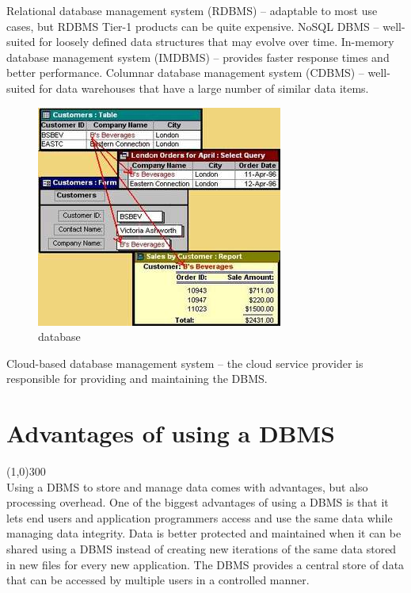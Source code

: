 \documentclass{article}
\begin{document}
Relational database management system (RDBMS) -- adaptable to most use cases, but RDBMS Tier-1 products can be quite expensive.
NoSQL DBMS -- well-suited for loosely defined data structures that may evolve over time.
In-memory database management system (IMDBMS) -- provides faster response times and better performance.
Columnar database management system (CDBMS) -- well-suited for data warehouses that have a large number of similar data items.
\begin{figure}[h]
\centering
\includegraphics[width=\linewidth5]{2.jpg}

\caption{database}
\end{figure}
Cloud-based database management system -- the cloud service provider is responsible for providing and maintaining the DBMS.




\newpage
\section{Advantages of using a DBMS}
\line(1,0){300}\\
Using a DBMS to store and manage data comes with advantages, but also processing overhead. One of the biggest advantages of using a DBMS is that it lets end users and application programmers access and use the same data while managing data integrity. Data is better protected and maintained when it can be shared using a DBMS instead of creating new iterations of the same data stored in new files for every new application. The DBMS provides a central store of data that can be accessed by multiple users in a controlled manner.
\end{document}
